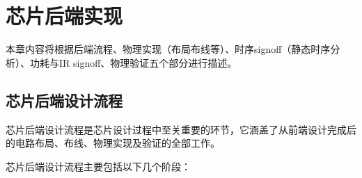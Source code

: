 
\chapter{芯片后端实现}\label{chap:17-chip-backend}

本章内容将根据后端流程、物理实现（布局布线等）、时序signoff（静态时序分析）、功耗与IR signoff、物理验证五个部分进行描述。

\section{芯片后端设计流程}\label{sec:17-chip-backend-001}

芯片后端设计流程是芯片设计过程中至关重要的环节，它涵盖了从前端设计完成后的电路布局、布线、物理实现及验证的全部工作。

芯片后端设计流程主要包括以下几个阶段：

